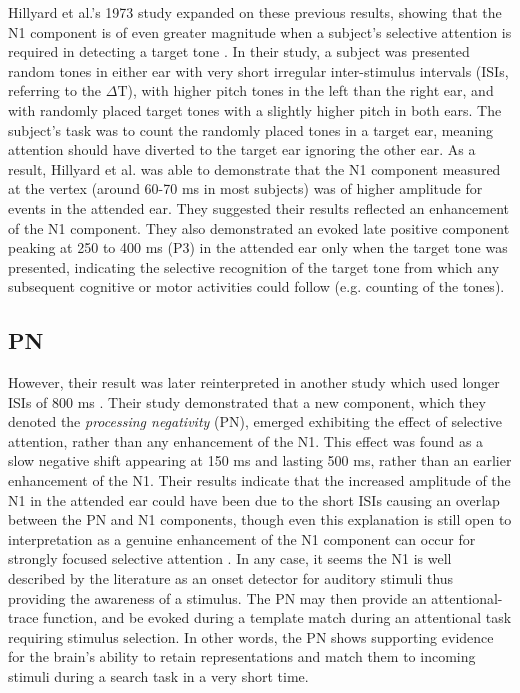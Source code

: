 \documentclass[a4paper,11pt,final]{ThesisStyle}
\begin{document}
Hillyard et al.'s 1973 study expanded on these previous results, showing that the N1 component is of even greater magnitude when a subject's selective attention is required in detecting a target tone \cite{Hillyard1973}.   In their study, a subject was presented random tones in either ear with very short irregular inter-stimulus intervals (ISIs, referring to the $\Delta \text{T}$), with higher pitch tones in the left than the right ear, and with randomly placed target tones with a slightly higher pitch in both ears.  The subject's task was to count the randomly placed tones in a target ear, meaning attention should have diverted to the target ear ignoring the other ear.  As a result, Hillyard et al. was able to demonstrate that the N1 component measured at the vertex (around 60-70 ms in most subjects) was of higher amplitude for events in the attended ear.  They suggested their results reflected an enhancement of the N1 component.  They also demonstrated an evoked late positive component peaking at 250 to 400 ms (P3) in the attended ear only when the target tone was presented, indicating the selective recognition of the target tone from which any subsequent cognitive or motor activities could follow (e.g. counting of the tones). 

\subsection{PN}

However, their result was later reinterpreted in another study which used longer ISIs of 800 ms \cite{Naatanen1978}.  Their study demonstrated that a new component, which they denoted the \textit{processing negativity} (PN), emerged exhibiting the effect of selective attention, rather than any enhancement of the N1.  This effect was found as a slow negative shift appearing at 150 ms and lasting 500 ms, rather than an earlier enhancement of the N1.  Their results indicate that the increased amplitude of the N1 in the attended ear could have been due to the short ISIs causing an overlap between the PN and N1 components, though even this explanation is still open to interpretation as a genuine enhancement of the N1 component can occur for strongly focused selective attention \cite{Naatanen1978,Hillyard1983,Naatanen2011}.  In any case, it seems the N1 is well described by the literature as an onset detector for auditory stimuli thus providing the awareness of a stimulus.  The PN may then provide an attentional-trace function, and be evoked during a template match during an attentional task requiring stimulus selection.  In other words, the PN shows supporting evidence for the brain's ability to retain representations and match them to incoming stimuli during a search task in a very short time.
\end{document}
